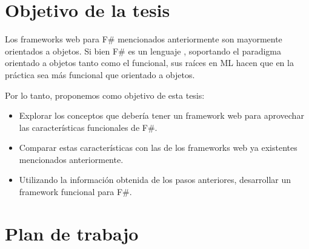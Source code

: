 \documentclass[12pt]{article}
\begin{document}
\section{Objetivo de la tesis}

Los frameworks web para F\# mencionados anteriormente son mayormente orientados a objetos. Si bien F\# es un lenguaje , soportando el paradigma orientado a objetos tanto como el funcional, sus raíces en ML hacen que en la práctica sea más funcional que orientado a objetos.

Por lo tanto, proponemos como objetivo de esta tesis:
\begin{itemize}
	\item Explorar los conceptos que debería tener un framework web para aprovechar las características funcionales de F\#.
	\item Comparar estas características con las de los frameworks web ya existentes mencionados anteriormente.
	\item Utilizando la información obtenida de los pasos anteriores, desarrollar un framework funcional para F\#. 
\end{itemize}

\section{Plan de trabajo}

\printglossaries



\end{document}
